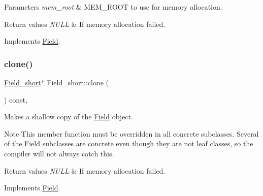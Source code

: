 \begin{DoxyParams}{Parameters}
{\em mem\+\_\+root} & M\+E\+M\+\_\+\+R\+O\+OT to use for memory allocation. \\
\hline
\end{DoxyParams}

\begin{DoxyRetVals}{Return values}
{\em N\+U\+LL} & If memory allocation failed. \\
\hline
\end{DoxyRetVals}


Implements \mbox{\hyperlink{classField_a64979bcb9345803b031fff76a0c3d9fe}{Field}}.

\mbox{\label{classField__short_a49ed5516e3c4db861a861fe07af2e651}} 
\subsubsection{\texorpdfstring{clone()}{clone()}\hspace{0.1cm}{\footnotesize\ttfamily [2/2]}}
{\footnotesize\ttfamily \mbox{\hyperlink{classField__short}{Field\+\_\+short}}$\ast$ Field\+\_\+short\+::clone (\begin{DoxyParamCaption}{ }\end{DoxyParamCaption}) const\hspace{0.3cm}{\ttfamily [inline]}, {\ttfamily [virtual]}}

Makes a shallow copy of the \mbox{\hyperlink{classField}{Field}} object.

\begin{DoxyNote}{Note}
This member function must be overridden in all concrete subclasses. Several of the \mbox{\hyperlink{classField}{Field}} subclasses are concrete even though they are not leaf classes, so the compiler will not always catch this.
\end{DoxyNote}

\begin{DoxyRetVals}{Return values}
{\em N\+U\+LL} & If memory allocation failed. \\
\hline
\end{DoxyRetVals}


Implements \mbox{\hyperlink{classField_a01a9a9aa3a618941e839b1b8793c969d}{Field}}.

\mbox{\label{classField__short_a96adb2b3df54346d954ee18eb2903927}} 
